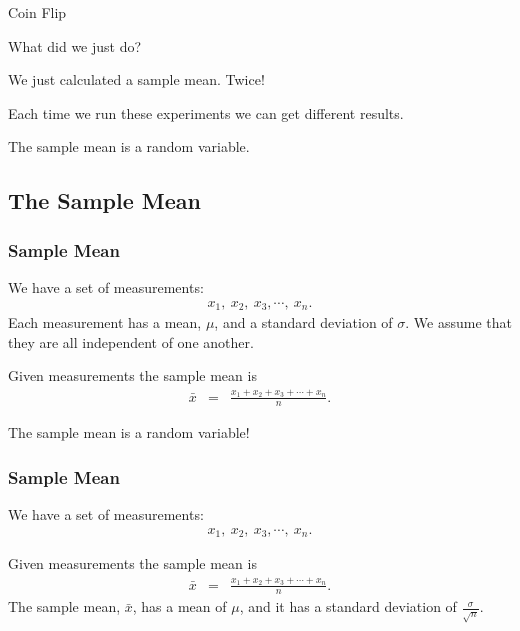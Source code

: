 \begin{frame}{Coin Flip}

What did we just do? 

  {
    We just calculated a sample mean. Twice!
  }

  {
    Each time we run these experiments we can get different results.

    The sample mean is a random variable.
  }
  
\end{frame}

\subsection{The Sample Mean}

\begin{frame}
  \frametitle{Sample Mean}

  We have a set of measurements:
  \begin{eqnarray*}
    x_1,~x_2,~x_3,\cdots,~x_n.
  \end{eqnarray*}
  Each measurement has a mean, $\mu$, and a standard deviation of
  $\sigma$. We assume that they are all independent of one another.
  
  {
    \begin{definition}
      Given measurements the sample mean is 
      \begin{eqnarray*}
        \bar{x} & = & \frac{x_1+x_2+x_3+\cdots+x_n}{n}.
      \end{eqnarray*}
    \end{definition}
  }

  {
    The sample mean is a random variable!
  }

\end{frame}


\begin{frame}
  \frametitle{Sample Mean}

  We have a set of measurements:
  \begin{eqnarray*}
    x_1,~x_2,~x_3,\cdots,~x_n.
  \end{eqnarray*}
  
  \begin{definition}
    Given measurements the sample mean is 
    \begin{eqnarray*}
      \bar{x} & = & \frac{x_1+x_2+x_3+\cdots+x_n}{n}.
    \end{eqnarray*}
    The sample mean, $\bar{x}$,  has a mean of $\mu$, and it has a
    standard deviation of $\frac{\sigma}{\sqrt{n}}$.
  \end{definition}

\end{frame}


